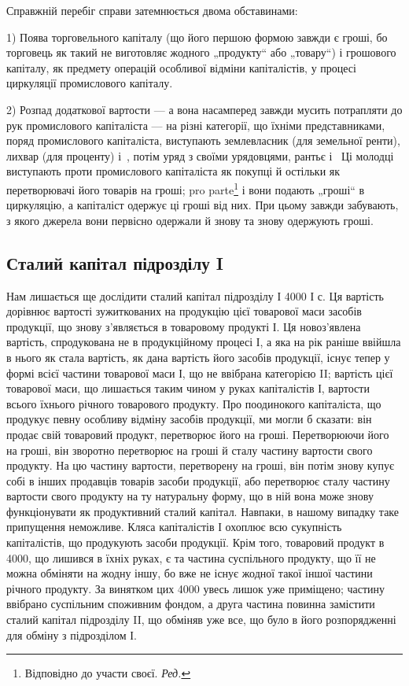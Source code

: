 
Справжній перебіг справи затемнюється двома обставинами:

1) Поява торговельного капіталу (що його першою формою
завжди є гроші, бо торговець як такий не виготовляє жодного
„продукту“ або „товару“) і грошового капіталу, як предмету
операцій особливої відміни капіталістів, у процесі циркуляції промислового
капіталу.

2) Розпад додаткової вартости — а вона насамперед завжди мусить
потрапляти до рук промислового капіталіста — на різні категорії, що їхніми
представниками, поряд промислового капіталіста, виступають землевласник
(для земельної ренти), лихвар (для проценту) і~, потім уряд з своїми
урядовцями, рантьє і~ Ці молодці виступають проти промислового
капіталіста як покупці й остільки як перетворювачі його товарів на гроші;
pro parte\footnote*{
Відповідно до участи своєї. \emph{Ред.}
} і вони подають „гроші“ в циркуляцію, а капіталіст одержує
ці гроші від них. При цьому завжди забувають, з якого джерела вони
первісно одержали й знову та знову одержують гроші.

\subsection{Сталий капітал підрозділу I\footnotemark{}}

Нам лишається ще дослідити сталий капітал підрозділу І \deq{} 4000 І с.
Ця вартість дорівнює вартості зужиткованих на продукцію цієї товарової
маси засобів продукції, що знову з’являється в товаровому продукті І.
Ця новоз’явлена вартість, спродукована не в продукційному процесі І, а
яка на рік раніше ввійшла в нього як стала вартість, як дана вартість
його засобів продукції, існує тепер у формі всієї частини товарової маси І,
що не ввібрана категорією II; вартість цієї товарової маси, що лишається
таким чином у руках капіталістів І, \deq{}  вартости всього їхнього річного
товарового продукту. Про поодинокого капіталіста, що продукує певну
особливу відміну засобів продукції, ми могли б сказати: він продає свій
товаровий продукт, перетворює його на гроші. Перетворюючи його на
гроші, він зворотно перетворює на гроші й сталу частину вартости свого
продукту. На цю частину вартости, перетворену на гроші, він потім знову
купує собі в інших продавців товарів засоби продукції, або перетворює
сталу частину вартости свого продукту на ту натуральну форму, що
в ній вона може знову функціонувати як продуктивний сталий капітал.
Навпаки, в нашому випадку таке припущення неможливе. Кляса капіталістів
І охоплює всю сукупність капіталістів, що продукують засоби продукції.
Крім того, товаровий продукт в 4000, що лишився в їхніх руках,
є та частина суспільного продукту, що її не можна обміняти на жодну
іншу, бо вже не існує жодної такої іншої частини річного продукту. За
винятком цих 4000 увесь лишок уже приміщено; частину ввібрано суспільним
споживним фондом, а друга частина повинна замістити сталий
капітал підрозділу II, що обміняв уже все, що було в його розпорядженні
для обміну з підрозділом І.
\parbreak{}  %
